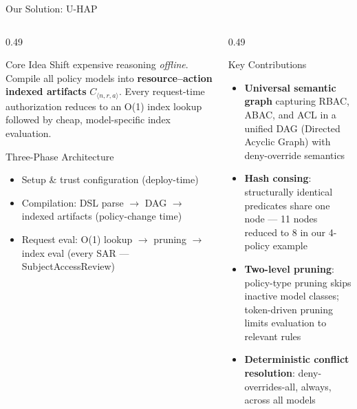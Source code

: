 \documentclass[aspectratio=169,10pt]{beamer}
\newcommand{\tightitems}{%
  \setlength{\topsep}{1pt}%
  \setlength{\itemsep}{2pt}%
  \setlength{\parsep}{0pt}%
  \setlength{\parskip}{0pt}%
}
\newcommand{\phasepill}[1]{%
  \tcbox[colback=uhapAmber,colframe=uhapAmberBorder,boxrule=0.3pt,arc=1mm,
         left=3pt,right=3pt,top=0pt,bottom=0pt,on line,nobeforeafter]{%
    \tiny\color{uhapNavyD}\textbf{#1}}%
}
\begin{document}
\begin{frame}[t]{Our Solution: U-HAP}
\vspace{3pt}
\begin{columns}[T,onlytextwidth]
\begin{column}{0.49\textwidth}
\begin{callout}{Core Idea}
Shift expensive reasoning \emph{offline}. Compile all policy models into
\textbf{resource--action indexed artifacts} $C_{\langle n,r,a\rangle}$.
Every request-time authorization reduces to an O(1) index lookup followed
by cheap, model-specific index evaluation.
\end{callout}
\vspace{3pt}
\begin{callout}{Three-Phase Architecture}
\begin{itemize}\tightitems
\item \phasepill{Phase 1} Setup \& trust configuration (deploy-time)
\item \phasepill{Phase 2} Compilation: DSL parse $\to$ DAG $\to$ indexed artifacts (policy-change time)
\item \phasepill{Phase 3} Request eval: O(1) lookup $\to$ pruning $\to$ index eval (every SAR --- SubjectAccessReview)
\end{itemize}
\end{callout}
\end{column}
\begin{column}{0.49\textwidth}
\begin{callout}{Key Contributions}
\begin{itemize}\tightitems
\item \textbf{Universal semantic graph} capturing RBAC, ABAC, and ACL in a unified DAG (Directed Acyclic Graph) with deny-override semantics
\item \textbf{Hash consing}: structurally identical predicates share one node — 11 nodes reduced to 8 in our 4-policy example
\item \textbf{Two-level pruning}: policy-type pruning skips inactive model classes; token-driven pruning limits evaluation to relevant rules
\item \textbf{Deterministic conflict resolution}: deny-overrides-all, always, across all models
\end{itemize}
\end{callout}
\end{column}
\end{columns}
\end{frame}
\end{document}
